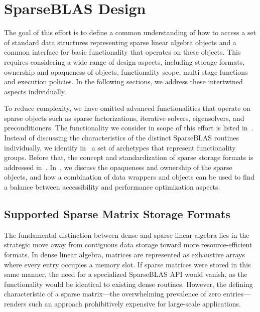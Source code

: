 \documentclass[manuscript,review]{acmart}
\begin{document}
\section{SparseBLAS Design}
\label{sec:api-design}
The goal of this effort is to define a common understanding of how to access a set of standard data structures representing sparse linear algebra objects and a common interface for basic functionality that operates on these objects.
This requires considering a wide range of design aspects, including storage formats, ownership and opaqueness of objects, functionality scope, multi-stage functions and execution policies. 
In the following sections, we address these intertwined aspects individually. 

To reduce complexity, we have omitted advanced functionalities that operate on sparse objects such as sparse factorizations, 
iterative solvers, eigensolvers, and preconditioners. 
The functionality we consider in scope of this effort is listed in~. Instead of discussing the characteristics of the distinct SparseBLAS routines individually, we identify in~ a set of archetypes that represent functionality groups. Before that, the concept and standardization of sparse storage formats is addressed in~. In~, we discuss the opaqueness and ownership of the sparse objects, and how a combination of data wrappers and objects can be used to find a balance between accessibility and performance optimization aspects.




\subsection{Supported Sparse Matrix Storage Formats}
\label{sec:sparse-formats}

The fundamental distinction between dense and sparse linear algebra lies in the strategic move away from contiguous data storage toward more resource-efficient formats. In dense linear algebra, matrices are represented as exhaustive arrays where every entry occupies a memory slot. If sparse matrices were stored in this same manner, the need for a specialized SparseBLAS API would vanish, as the functionality would be identical to existing dense routines. However, the defining characteristic of a sparse matrix—the overwhelming prevalence of zero entries—renders such an approach prohibitively expensive for large-scale applications.
\end{document}
